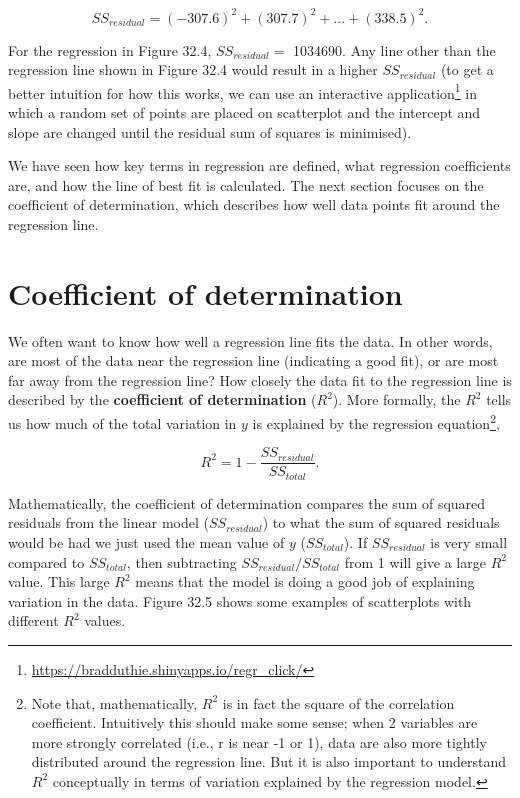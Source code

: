 \documentclass[
  openany]{scrbook}
\begin{document}
\[SS_{residual} = (-307.6)^{2} + (307.7)^2 + ... + (338.5)^{2}.\]

For the regression in Figure 32.4, \(SS_{residual} =\) 1034690.
Any line other than the regression line shown in Figure 32.4 would result in a higher \(SS_{residual}\) (to get a better intuition for how this works, we can use an interactive application\footnote{\url{https://bradduthie.shinyapps.io/regr_click/}} in which a random set of points are placed on scatterplot and the intercept and slope are changed until the residual sum of squares is minimised).

We have seen how key terms in regression are defined, what regression coefficients are, and how the line of best fit is calculated.
The next section focuses on the coefficient of determination, which describes how well data points fit around the regression line.

\hypertarget{coefficient-of-determination}{%
\section{Coefficient of determination}\label{coefficient-of-determination}}

We often want to know how well a regression line fits the data.
In other words, are most of the data near the regression line (indicating a good fit), or are most far away from the regression line?
How closely the data fit to the regression line is described by the \textbf{coefficient of determination} (\(R^{2}\)).
More formally, the \(R^{2}\) tells us how much of the total variation in \(y\) is explained by the regression equation\footnote{Note that, mathematically, \(R^{2}\) is in fact the square of the correlation coefficient. Intuitively this should make some sense; when 2 variables are more strongly correlated (i.e., r is near -1 or 1), data are also more tightly distributed around the regression line. But it is also important to understand \(R^{2}\) conceptually in terms of variation explained by the regression model.},

\[R^{2} = 1 - \frac{SS_{residual}}{SS_{total}}.\]

Mathematically, the coefficient of determination compares the sum of squared residuals from the linear model (\(SS_{residual}\)) to what the sum of squared residuals would be had we just used the mean value of \(y\) (\(SS_{total}\)).
If \(SS_{residual}\) is very small compared to \(SS_{total}\), then subtracting \(SS_{residual}/SS_{total}\) from 1 will give a large \(R^{2}\) value.
This large \(R^{2}\) means that the model is doing a good job of explaining variation in the data.
Figure 32.5 shows some examples of scatterplots with different \(R^{2}\) values.
\end{document}
